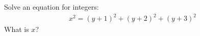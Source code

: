 Solve an equation for integers:
\begin{align*}
x^{2} = (y+1)^{2} + (y+2)^{2} +(y+3)^{2}
\end{align*}
What is $x$?

